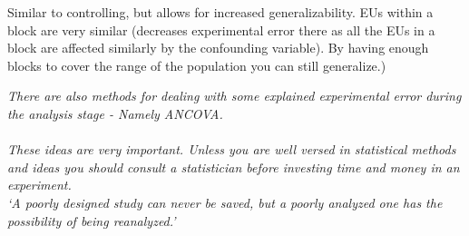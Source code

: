 \begin{enumerate}
\begin{enumerate}
\begin{center}
\end{center}
			Similar to controlling, but allows for increased generalizability.  EUs within a block are very similar (decreases experimental error there as all the EUs in a block are affected similarly by the confounding variable).  By having enough blocks to cover the range of the population you can still generalize.)
		\end{enumerate}
	\end{enumerate}
		\noindent\textit{There are also methods for dealing with some explained experimental error during the analysis stage - Namely ANCOVA.\\~\\
		These ideas are very important.  Unless you are well versed in statistical methods and ideas you should consult a statistician before investing time and money in an experiment.\\
`A poorly designed study can never be saved, but a poorly analyzed one has the possibility of being reanalyzed.'}
